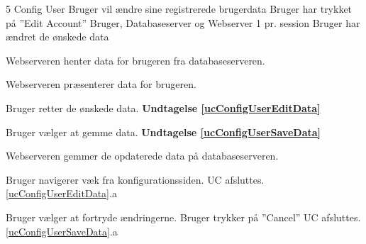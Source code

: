 \uchead
	{5} %
	{Config User} %
	{Bruger vil ændre sine registrerede brugerdata} %
	{Bruger har trykket på ''Edit Account''} %
	{Bruger, Databaseserver og Webserver} %
	{} %
	{1 pr. session} %
	{Bruger har ændret de ønskede data} %


\item\label{ucConfigUserPresentData} Webserveren henter data for brugeren fra databaseserveren.

\item Webserveren præsenterer data for brugeren.

\item\label{ucConfigUserEditData} Bruger retter de ønskede data. \textbf{Undtagelse \ref{ucConfigUserEditData}}

\item\label{ucConfigUserSaveData} Bruger vælger at gemme data. \textbf{Undtagelse \ref{ucConfigUserSaveData}}

\item Webserveren gemmer de opdaterede data på databaseserveren.



\ucdescriptionend %

\ucextension
	{Bruger navigerer væk fra konfigurationssiden.}
	{UC afsluttes.}
	{\ref{ucConfigUserEditData}.a}

\ucextension
	{Bruger vælger at fortryde ændringerne.}
	{Bruger trykker på ''Cancel'' \newline
	UC afsluttes.}
	{\ref{ucConfigUserSaveData}.a}

